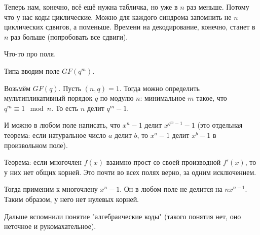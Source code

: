 \begin{Rem}
Теперь нам, конечно, всё ещё нужна табличка, но уже в $n$ раз меньше.
Потому что у нас коды циклические.
Можно для каждого синдрома запомнить не $n$ циклических сдвигов,
а поменьше.
Времени на декодирование, конечно, станет в $n$ раз больше
(попробовать все сдвиги).
\end{Rem}

Что-то про поля.

Типа вводим поле $GF(q^m)$.

Возьмём $GF(q)$.
Пусть $(n,q)=1$.
Тогда можно определить мультипликативный порядок $q$ по модулю $n$:
минимальное $m$ такое, что $q^m \equiv 1 \mod n$.
То есть $n$ делит $q^m-1$.

И можно в любом поле написать, что $x^n-1$ делит $x^{q^m-1}-1$
(это отдельная теорема: если натуральное число $a$
делит $b$, то $x^a-1$ делит $x^b-1$ в произвольном поле).

Теорема: если многочлен $f(x)$ взаимно прост со своей производной
$f'(x)$, то у них нет общих корней.
Это почти во всех полях верно, за одним исключением.

Тогда применим к многочлену $x^n-1$.
Он в любом поле не делится на $nx^{n-1}$.
Таким образом, у него нет нулевых корней.

Дальше вспомнили понятие "алгебраические коды" (такого понятия нет, оно неточное и рукомахательное).

